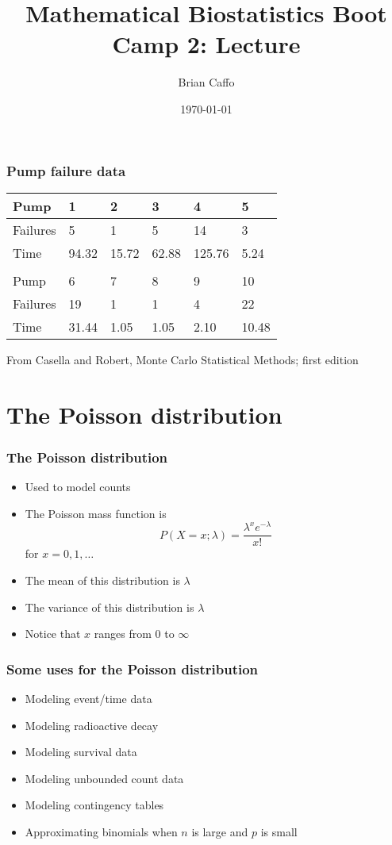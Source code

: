 \documentclass[aspectratio=169]{beamer}
\title{Mathematical Biostatistics Boot Camp 2: Lecture }
\author{Brian Caffo}
\date{\today}
\institute[Department of Biostatistics]{
  Department of Biostatistics \\
  Johns Hopkins Bloomberg School of Public Health\\
  Johns Hopkins University
}
\begin{document}
\frame{\titlepage}


\begin{frame}\frametitle{Pump failure data}
\begin{center}
\ttfamily
\begin{tabular}{llllll} 
Pump     & 1     & 2     & 3     & 4      & 5     \\ \hline
Failures & 5     & 1     & 5     & 14     & 3     \\ 
Time     & 94.32 & 15.72 & 62.88 & 125.76 & 5.24  \\ \hline \\
Pump     & 6     & 7     & 8     & 9      & 10    \\ \hline
Failures & 19    & 1     & 1     & 4      & 22    \\ 
Time     & 31.44 & 1.05  & 1.05  & 2.10   & 10.48 \\ \hline 
\end{tabular}
\end{center}
From Casella and Robert, Monte Carlo Statistical Methods; first edition
\normalfont \normalsize
\end{frame}

\section{The Poisson distribution}
\begin{frame}\frametitle{The Poisson distribution}
\begin{itemize}
\item Used to model counts
\item The Poisson mass function is
$$
P(X = x; \lambda) = \frac{\lambda^x e^{-\lambda}}{x!}
$$
for $x=0,1,\ldots$
\item The mean of this distribution is $\lambda$
\item The variance of this distribution is $\lambda$
\item Notice that $x$ ranges from $0$ to $\infty$
\end{itemize}
\end{frame}

\begin{frame}\frametitle{Some uses for the Poisson distribution}
\begin{itemize}
\item Modeling event/time data
\item Modeling radioactive decay
\item Modeling survival data
\item Modeling unbounded count data 
\item Modeling contingency tables
\item Approximating binomials when $n$ is large and $p$ is small
\end{itemize}
\end{frame}
\end{document}
